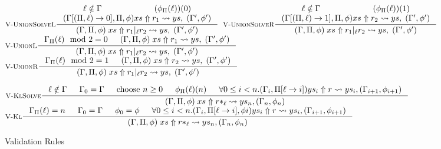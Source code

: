 \begin{figure}
\begin{center}
    \vspace{0.5em}
    $\inference
        [\ValidateUnionSolveLeft]
        {
            \envhasnt{\lab}
        & (\predtrack_\pathvar(\lab))(0)
        \\ (\envput{\lab}{0}, \pathvar, \predtrack) xs \gennedby r_1 \gennedarrow ys, \valout
        }
        {\valinp xs \gennedby r_1 |_{\lab} r_2 \gennedarrow ys, \valout}$
    $\inference
        [\ValidateUnionSolveRight]
        {
            \envhasnt{\lab}
        & (\predtrack_\pathvar(\lab))(1)
        \\ (\envput{\lab}{1}, \pathvar, \predtrack) xs \gennedby r_2 \gennedarrow ys, \valout}
        {\valinp xs \gennedby r_1 |_{\lab} r_2 \gennedarrow ys, \valout}$
    $\inference
        [\ValidateUnionLeft]
        {\envget{\lab} \mod 2 = 0 & \valinp xs \gennedby r_1 \gennedarrow ys, \valout}
        {\valinp xs \gennedby r_1 |_{\lab} r_2 \gennedarrow ys, \valout}$
    $\inference
        [\ValidateUnionRight]
        {\envget{\lab} \mod 2 = 1 & \valinp xs \gennedby r_2 \gennedarrow ys, \valout}
        {\valinp xs \gennedby r_1 |_{\lab} r_2 \gennedarrow ys, \valout}$
    
    $\inference
        [\ValidateStarSolve]
        { \envhasnt{\lab}
            & \env_0 = \env
            & \text{choose } n \geq 0
            & \predtrack_\pathvar(\lab)(n)
            &\forall 0 \leq i < n . (\env_{i}, \pathput{\lab}{i}) ys_i \gennedby r \gennedarrow ys_{i}, (\env_{i + 1}, \predtrack_{i + 1})
         }
        {\valinp xs \gennedby r*_{\lab} \gennedarrow ys_n, (\env_{n}, \predtrack_n)}$
    $\inference
         [\ValidateStar]
         { \envget{\lab} = n
            & \env_0 = \env & \predtrack_0 = \predtrack
            & \forall 0 \leq i < n . (\env_{i}, \pathput{\lab}{i}, \predtrack{i}) ys_i \gennedby r \gennedarrow ys_{i}, (\env_{i + 1}, \predtrack_{i + 1})
         }
         {\valinp xs \gennedby r*_{\lab} \gennedarrow ys_n, (\env_n, \predtrack_n)}$

    \caption{Validation Rules}
    \label{fig:validation-rules}
\end{center}
\end{figure}